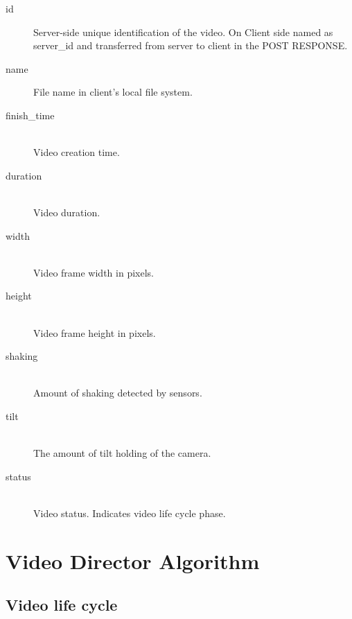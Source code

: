 \documentclass[conference]{IEEEtran}
\begin{document}
\begin{description}
	\item[id] 
		Server-side unique identification of the video. 
		On Client side named as server\_id and transferred from server to client in the POST RESPONSE.
		
	\item[name]
		File name in client's local file system.
		
	\item[finish\_time]\hfill\\
		Video creation time.
		
	\item[duration]\hfill\\
		Video duration.
		
	\item[width]\hfill\\
		Video frame width in pixels.

	\item[height]\hfill\\
		Video frame height in pixels.		
	
	\item[shaking]\hfill\\
		Amount of shaking detected by sensors.

	\item[tilt]\hfill\\
		The amount of tilt holding of the camera.
	
	\item[status]\hfill\\
		Video status. Indicates video life cycle phase.

		
\end{description}

\section{Video Director Algorithm}

\subsection{Video life cycle}
\end{document}
